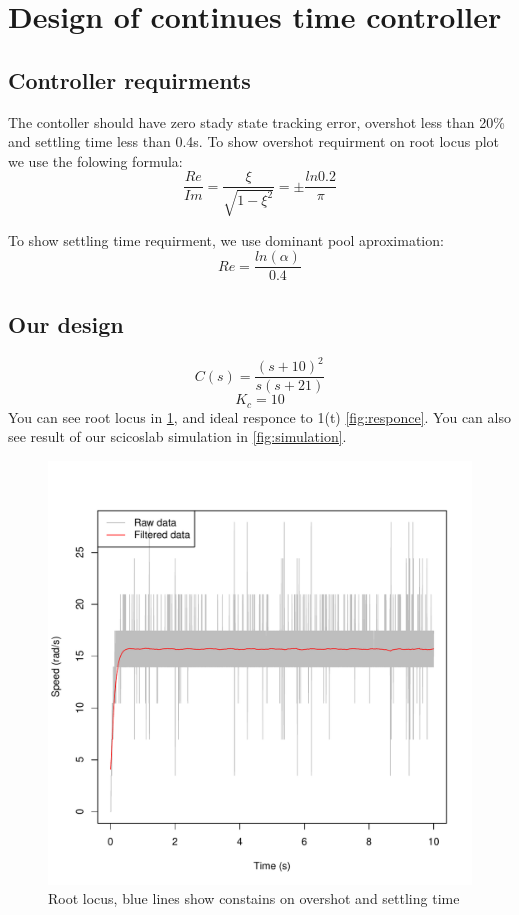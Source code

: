 \documentclass[a4paper,12pt,oneside]{article}
\begin{document}
\section{Design of continues time controller}
\subsection{Controller requirments}
The contoller should have zero stady state tracking error, overshot less than 20\% and settling time less than 0.4s. To show overshot requirment on root locus plot we use the folowing formula:
\begin{equation}
\frac{Re}{Im} = \frac{\xi}{\sqrt{1-\xi^{2}}} = \pm\frac{ln{0.2}}{\pi}
\end{equation}

To show settling time requirment, we use dominant pool aproximation:
\begin{equation}
Re = \frac{ln(\alpha)}{0.4}
\end{equation}

\subsection{Our design}
\begin{equation}
C(s) = \frac{(s+10)^2}{s(s+21)}
\end{equation}
\begin{equation}
K_c = 10
\end{equation}
You can see root locus in \cref{fig:root_locus}, and ideal responce to 1(t) \cref{fig:responce}. You can also see result of our scicoslab simulation  in \cref{fig:simulation}.

\begin{figure}[t]
	\centering
	\includegraphics[width=\columnwidth]{../motor_data/plots/filtering/90}
	\caption{Root locus, blue lines show constains on overshot and settling time}
	\label{fig:root_locus}
\end{figure}
\end{document}
